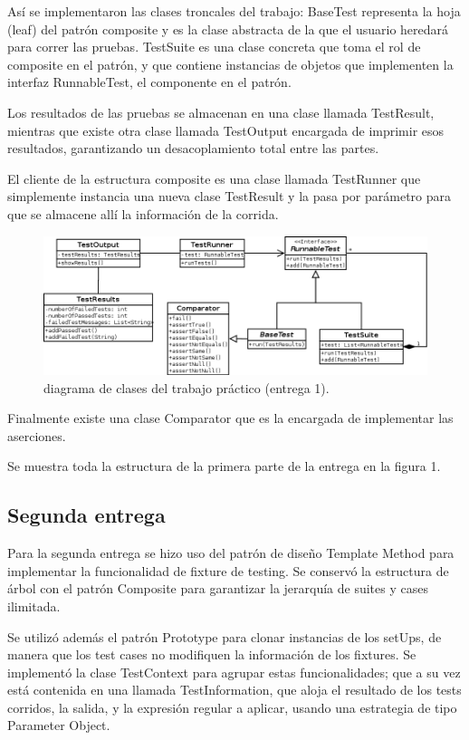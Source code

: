 \documentclass[12pt]{article}
\begin{document}
Así se implementaron las clases troncales del trabajo: BaseTest representa la 
hoja (leaf) del patrón composite y es la clase abstracta de la que el usuario 
heredará para correr las pruebas. TestSuite es una clase concreta que toma el 
rol de composite en el patrón, y que contiene instancias de objetos que 
implementen la interfaz RunnableTest, el componente en el patrón.

Los resultados de las pruebas se almacenan en una clase llamada TestResult,
mientras que existe otra clase llamada TestOutput encargada de imprimir esos
resultados, garantizando un desacoplamiento total entre las partes.

El cliente de la estructura composite es una clase llamada TestRunner que
simplemente instancia una nueva clase TestResult y la pasa por parámetro para 
que se almacene allí la información de la corrida.

\begin{figure}[h!]
\begin{center}
	\includegraphics[scale=0.50,angle=90]{./ClassDiagram}
\end{center}
	\caption{diagrama de clases del trabajo práctico (entrega 1).}
\end{figure}

Finalmente existe una clase Comparator que es la encargada de implementar las 
aserciones.

Se muestra toda la estructura de la primera parte de la entrega en la figura 1.

\subsection{Segunda entrega}
Para la segunda entrega se hizo uso del patrón de diseño Template Method para 
implementar la funcionalidad de fixture de testing. Se conservó la estructura
de árbol con el patrón Composite para garantizar la jerarquía de suites y cases
ilimitada.

Se utilizó además el patrón Prototype para clonar instancias de los setUps, de
manera que los test cases no modifiquen la información de los fixtures.
Se implementó la clase TestContext para agrupar estas funcionalidades; que a su
vez está contenida en una llamada TestInformation, que aloja el resultado de los
tests corridos, la salida, y la expresión regular a aplicar, usando una estrategia
de tipo Parameter Object.
\end{document}
